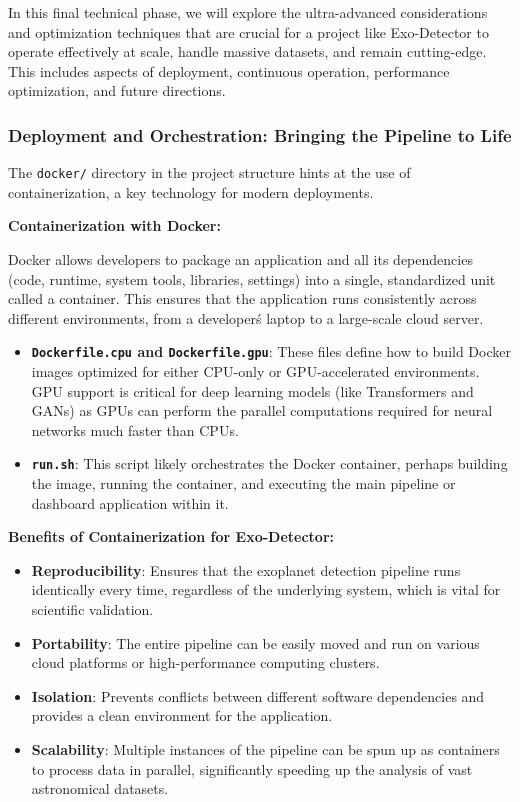 \documentclass{article}
\begin{document}
In this final technical phase, we will explore the ultra-advanced considerations and optimization techniques that are crucial for a project like Exo-Detector to operate effectively at scale, handle massive datasets, and remain cutting-edge. This includes aspects of deployment, continuous operation, performance optimization, and future directions.

\subsubsection{Deployment and Orchestration: Bringing the Pipeline to Life}

The \texttt{docker/} directory in the project structure hints at the use of containerization, a key technology for modern deployments.

\textbf{Containerization with Docker:}

Docker allows developers to package an application and all its dependencies (code, runtime, system tools, libraries, settings) into a single, standardized unit called a container. This ensures that the application runs consistently across different environments, from a developer\'s laptop to a large-scale cloud server.

\begin{itemize}
    \item \textbf{\texttt{Dockerfile.cpu} and \texttt{Dockerfile.gpu}}: These files define how to build Docker images optimized for either CPU-only or GPU-accelerated environments. GPU support is critical for deep learning models (like Transformers and GANs) as GPUs can perform the parallel computations required for neural networks much faster than CPUs.
    \item \textbf{\texttt{run.sh}}: This script likely orchestrates the Docker container, perhaps building the image, running the container, and executing the main pipeline or dashboard application within it.
\end{itemize}

\textbf{Benefits of Containerization for Exo-Detector:}

\begin{itemize}
    \item \textbf{Reproducibility}: Ensures that the exoplanet detection pipeline runs identically every time, regardless of the underlying system, which is vital for scientific validation.
    \item \textbf{Portability}: The entire pipeline can be easily moved and run on various cloud platforms or high-performance computing clusters.
    \item \textbf{Isolation}: Prevents conflicts between different software dependencies and provides a clean environment for the application.
    \item \textbf{Scalability}: Multiple instances of the pipeline can be spun up as containers to process data in parallel, significantly speeding up the analysis of vast astronomical datasets.
\end{itemize}
\end{document}
